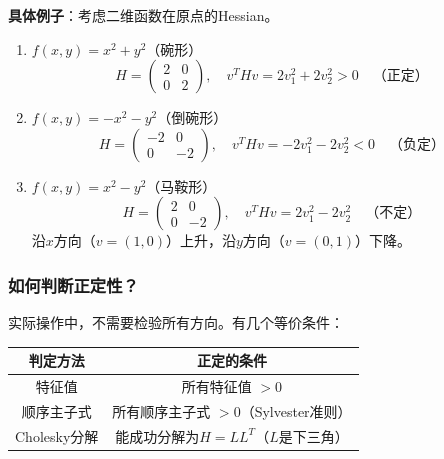 \begin{center}
\end{center}

\begin{center}
\end{center}

\textbf{具体例子}：考虑二维函数在原点的Hessian。

\begin{enumerate}
    \item $f(x,y) = x^2 + y^2$（碗形）
    \[
    H = \begin{pmatrix} 2 & 0 \\ 0 & 2 \end{pmatrix}, \quad v^T H v = 2v_1^2 + 2v_2^2 > 0 \quad \text{（正定）}
    \]

    \item $f(x,y) = -x^2 - y^2$（倒碗形）
    \[
    H = \begin{pmatrix} -2 & 0 \\ 0 & -2 \end{pmatrix}, \quad v^T H v = -2v_1^2 - 2v_2^2 < 0 \quad \text{（负定）}
    \]

    \item $f(x,y) = x^2 - y^2$（马鞍形）
    \[
    H = \begin{pmatrix} 2 & 0 \\ 0 & -2 \end{pmatrix}, \quad v^T H v = 2v_1^2 - 2v_2^2 \quad \text{（不定）}
    \]
    沿$x$方向（$v=(1,0)$）上升，沿$y$方向（$v=(0,1)$）下降。
\end{enumerate}

\subsubsection{如何判断正定性？}

实际操作中，不需要检验所有方向。有几个等价条件：

\begin{center}
\begin{tabular}{c|c}
\toprule
\textbf{判定方法} & \textbf{正定的条件} \\
\midrule
特征值 & 所有特征值 $> 0$ \\
顺序主子式 & 所有顺序主子式 $> 0$（Sylvester准则） \\
Cholesky分解 & 能成功分解为$H = LL^T$（$L$是下三角） \\
\bottomrule
\end{tabular}
\end{center}

